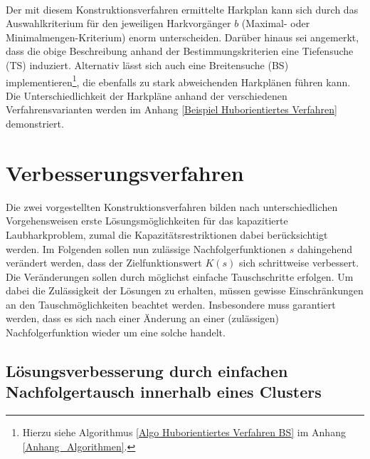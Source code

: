 \documentclass[fontsize=12pt,doubleside,openany,listof=totoc,listof=flat,listof=nochaptergap,numbers=noenddot]{scrbook}
\theoremstyle{style}
\begin{document}
\phantom \\
\noindent Der mit diesem Konstruktionsverfahren ermittelte \glqq Harkplan\grqq{} kann sich durch das Auswahlkriterium für den jeweiligen Harkvorgänger $b$ (Maximal- oder Minimalmengen-Kriterium) enorm unterscheiden. Darüber hinaus sei angemerkt, dass die obige Beschreibung anhand der Bestimmungskriterien eine Tiefensuche (TS) induziert. Alternativ lässt sich auch eine Breitensuche (BS) implementieren\footnote{Hierzu siehe Algorithmus \ref{Algo Huborientiertes Verfahren BS} im Anhang \ref{Anhang_Algorithmen}.}, die ebenfalls zu stark abweichenden Harkplänen führen kann. Die Unterschiedlichkeit der Harkpläne anhand der verschiedenen Verfahrensvarianten werden im Anhang \ref{Beispiel Huborientiertes Verfahren} demonstriert.



\section{Verbesserungsverfahren}
\label{section_Verbesserungsverfahren}

Die zwei vorgestellten Konstruktionsverfahren bilden nach unterschiedlichen Vorgehensweisen erste Lösungsmöglichkeiten für das kapazitierte Laubharkproblem, zumal die Kapazitätsrestriktionen dabei berücksichtigt werden. Im Folgenden sollen nun zulässige Nachfolgerfunktionen $s$ dahingehend verändert werden, dass der Zielfunktionswert $K(s)$ sich schrittweise verbessert. Die Veränderungen sollen durch möglichst einfache Tauschschritte erfolgen. Um dabei die Zulässigkeit der Lösungen zu erhalten, müssen gewisse Einschränkungen an den Tauschmöglichkeiten beachtet werden. Insbesondere muss garantiert werden, dass es sich nach einer Änderung an einer (zulässigen) Nachfolgerfunktion wieder um eine solche handelt. 



\subsection{Lösungsverbesserung durch einfachen Nachfolgertausch innerhalb eines Clusters}
\label{subsectionEinfacherNachfolgertausch}
\end{document}
